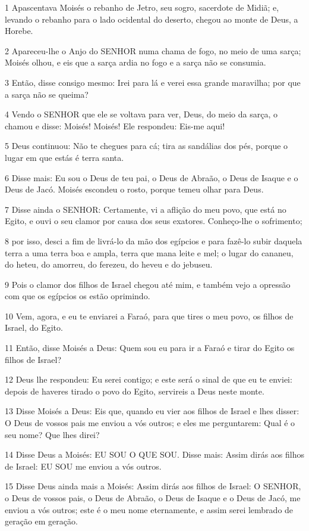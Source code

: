 \par 1 Apascentava Moisés o rebanho de Jetro, seu sogro, sacerdote de Midiã; e, levando o rebanho para o lado ocidental do deserto, chegou ao monte de Deus, a Horebe.
\par 2 Apareceu-lhe o Anjo do SENHOR numa chama de fogo, no meio de uma sarça; Moisés olhou, e eis que a sarça ardia no fogo e a sarça não se consumia.
\par 3 Então, disse consigo mesmo: Irei para lá e verei essa grande maravilha; por que a sarça não se queima?
\par 4 Vendo o SENHOR que ele se voltava para ver, Deus, do meio da sarça, o chamou e disse: Moisés! Moisés! Ele respondeu: Eis-me aqui!
\par 5 Deus continuou: Não te chegues para cá; tira as sandálias dos pés, porque o lugar em que estás é terra santa.
\par 6 Disse mais: Eu sou o Deus de teu pai, o Deus de Abraão, o Deus de Isaque e o Deus de Jacó. Moisés escondeu o rosto, porque temeu olhar para Deus.
\par 7 Disse ainda o SENHOR: Certamente, vi a aflição do meu povo, que está no Egito, e ouvi o seu clamor por causa dos seus exatores. Conheço-lhe o sofrimento;
\par 8 por isso, desci a fim de livrá-lo da mão dos egípcios e para fazê-lo subir daquela terra a uma terra boa e ampla, terra que mana leite e mel; o lugar do cananeu, do heteu, do amorreu, do ferezeu, do heveu e do jebuseu.
\par 9 Pois o clamor dos filhos de Israel chegou até mim, e também vejo a opressão com que os egípcios os estão oprimindo.
\par 10 Vem, agora, e eu te enviarei a Faraó, para que tires o meu povo, os filhos de Israel, do Egito.
\par 11 Então, disse Moisés a Deus: Quem sou eu para ir a Faraó e tirar do Egito os filhos de Israel?
\par 12 Deus lhe respondeu: Eu serei contigo; e este será o sinal de que eu te enviei: depois de haveres tirado o povo do Egito, servireis a Deus neste monte.
\par 13 Disse Moisés a Deus: Eis que, quando eu vier aos filhos de Israel e lhes disser: O Deus de vossos pais me enviou a vós outros; e eles me perguntarem: Qual é o seu nome? Que lhes direi?
\par 14 Disse Deus a Moisés: EU SOU O QUE SOU. Disse mais: Assim dirás aos filhos de Israel: EU SOU me enviou a vós outros.
\par 15 Disse Deus ainda mais a Moisés: Assim dirás aos filhos de Israel: O SENHOR, o Deus de vossos pais, o Deus de Abraão, o Deus de Isaque e o Deus de Jacó, me enviou a vós outros; este é o meu nome eternamente, e assim serei lembrado de geração em geração.
